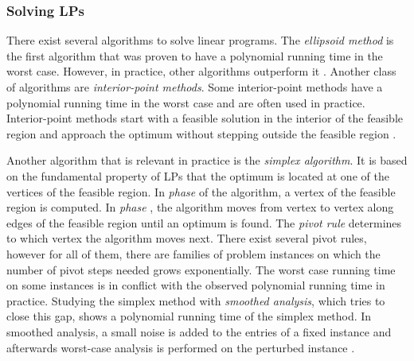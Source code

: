 \subsubsection{Solving LPs} \label{section:solving_lps}
There exist several algorithms to solve linear programs. The \textit{ellipsoid method} is the first algorithm that was proven to have a polynomial running time in the worst case. However, in practice, other algorithms outperform it \cite{understanding_lp}. Another class of algorithms are \textit{interior-point methods}. Some interior-point methods have a polynomial running time in the worst case and are often used in practice. Interior-point methods start with a feasible solution in the interior of the feasible region and approach the optimum without stepping outside the feasible region \cite{understanding_lp}. 

Another algorithm that is relevant in practice is the \textit{simplex algorithm}. It is based on the fundamental property of LPs that the optimum is located at one of the vertices of the feasible region. %
In \textit{phase } of the algorithm, a vertex of the feasible region is computed. In \textit{phase }, the algorithm moves from vertex to vertex along edges of the feasible region until an optimum is found. The \textit{pivot rule} determines to which vertex the algorithm moves next. There exist several pivot rules, however for all of them, there are families of problem instances on which the number of pivot steps needed grows exponentially. The worst case running time on some instances is in conflict with the observed polynomial running time in practice. Studying the simplex method with \textit{smoothed analysis}, which tries to close this gap, shows a polynomial running time of the simplex method. In smoothed analysis, a small noise is added to the entries of a fixed instance and afterwards worst-case analysis is performed on the perturbed instance \cite{huiberts,dadush}.


